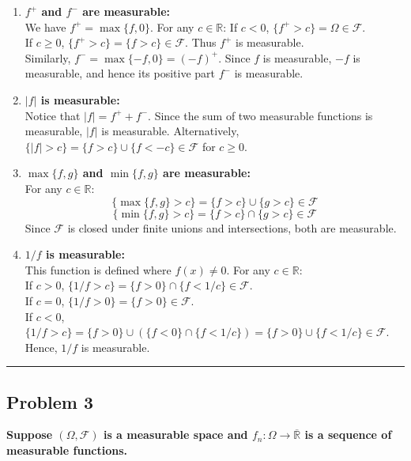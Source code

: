 \documentclass[11pt]{article}
\begin{document}
\begin{enumerate}
    \item \textbf{$f^+$ and $f^-$ are measurable:} \\
    We have $f^+ = \max\{f, 0\}$. For any $c \in \mathbb{R}$:
    If $c < 0$, $\{f^+ > c\} = \Omega \in \mathcal{F}$. \\
    If $c \ge 0$, $\{f^+ > c\} = \{f > c\} \in \mathcal{F}$. Thus $f^+$ is measurable. \\
    Similarly, $f^- = \max\{-f, 0\} = (-f)^+$. Since $f$ is measurable, $-f$ is measurable, and hence its positive part $f^-$ is measurable.

    \item \textbf{$|f|$ is measurable:} \\
    Notice that $|f| = f^+ + f^-$. Since the sum of two measurable functions is measurable, $|f|$ is measurable. Alternatively, $\{|f| > c\} = \{f > c\} \cup \{f < -c\} \in \mathcal{F}$ for $c \ge 0$.

    \item \textbf{$\max\{f, g\}$ and $\min\{f, g\}$ are measurable:} \\
    For any $c \in \mathbb{R}$:
    \[ \{\max\{f, g\} > c\} = \{f > c\} \cup \{g > c\} \in \mathcal{F} \]
    \[ \{\min\{f, g\} > c\} = \{f > c\} \cap \{g > c\} \in \mathcal{F} \]
    Since $\mathcal{F}$ is closed under finite unions and intersections, both are measurable.

    \item \textbf{$1/f$ is measurable:} \\
    This function is defined where $f(x) \neq 0$. For any $c \in \mathbb{R}$: \\
    If $c > 0$, $\{1/f > c\} = \{f > 0\} \cap \{f < 1/c\} \in \mathcal{F}$. \\
    If $c = 0$, $\{1/f > 0\} = \{f > 0\} \in \mathcal{F}$. \\
    If $c < 0$, $\{1/f > c\} = \{f > 0\} \cup (\{f < 0\} \cap \{f < 1/c\}) = \{f > 0\} \cup \{f < 1/c\} \in \mathcal{F}$. \\
    Hence, $1/f$ is measurable.
\end{enumerate}

\vspace{1em}
\hrule
\vspace{1em}

\subsection*{Problem 3}
\textbf{Suppose $(\Omega, \mathcal{F})$ is a measurable space and $f_n: \Omega \to \overline{\mathbb{R}}$ is a sequence of measurable functions.}
\end{document}
